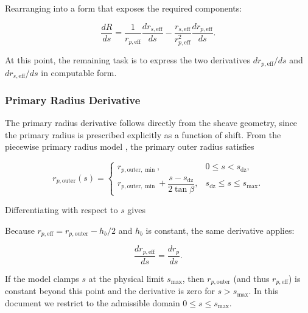 \documentclass[11pt]{article}
\numberwithin{equation}{section}
\begin{document}
Rearranging into a form that exposes the required components:

\begin{equation}
\frac{dR}{ds}
=
\frac{1}{r_{p,\text{eff}}}\frac{dr_{s,\text{eff}}}{ds}
-
\frac{r_{s,\text{eff}}}{r_{p,\text{eff}}^2}\frac{dr_{p,\text{eff}}}{ds}.
\label{eq:dRds_components}
\end{equation}


At this point, the remaining task is to express the two derivatives
$dr_{p,\text{eff}}/ds$ and $dr_{s,\text{eff}}/ds$ in computable form.

\subsubsection{Primary Radius Derivative}
\label{sec:drpds}

The primary radius derivative follows directly from the sheave geometry,
since the primary radius is prescribed explicitly as a function of shift.
From the piecewise primary radius model , the primary outer radius
satisfies

\[
r_{p,\text{outer}}(s)=
\begin{cases}
r_{p,\text{outer},\min}, & 0 \le s < s_{\mathrm{dz}}, \\[8pt]
r_{p,\text{outer},\min} + \dfrac{s - s_{\mathrm{dz}}}{2\tan\beta},
& s_{\mathrm{dz}} \le s \le s_{\max}.
\end{cases}
\]

Differentiating with respect to $s$ gives


Because $r_{p,\text{eff}} = r_{p,\text{outer}} - h_b/2$ and $h_b$ is constant,
the same derivative applies:

\begin{equation}
\frac{dr_{p,\text{eff}}}{ds} = \frac{dr_p}{ds}.
\label{eq:drpeffds}
\end{equation}


\begin{remarkbox}
If the model clamps $s$ at the physical limit $s_{\max}$, then $r_{p,\text{outer}}$
(and thus $r_{p,\text{eff}}$) is constant beyond this point and the derivative is zero
for $s>s_{\max}$. In this document we restrict to the admissible domain
$0\le s\le s_{\max}$.
\end{remarkbox}
\end{document}
